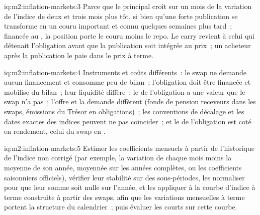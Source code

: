 \begin{solution}{iq:m2:inflation-markets:3}
Parce que le principal croît sur un mois de la variation de l'indice de deux et trois
mois plus tôt, si bien qu'une forte publication se transforme en un couru important et connu quelques
semaines plus tard~; financée au , la position porte le couru moins le
repo. Le carry revient à celui qui détenait l'obligation avant que la publication soit intégrée au prix~; un acheteur
après la publication le paie dans le prix à terme.
\end{solution}

\begin{solution}{iq:m2:inflation-markets:4}
Instruments et coûts différents~: le swap ne demande aucun financement et consomme peu de
bilan~; l'obligation doit être financée et mobilise du bilan~; leur liquidité
diffère~; le  de l'obligation a une valeur que le swap n'a pas~; l'offre et la demande
diffèrent (fonds de pension receveurs dans les swaps, émissions du Trésor en obligations)~; les
conventions de décalage et les dates exactes des indices peuvent ne pas coïncider~; et le
 de l'obligation est coté en rendement, celui du swap en .
\end{solution}

\begin{solution}{iq:m2:inflation-markets:5}
Estimer les coefficients mensuels à partir de l'historique de l'indice non corrigé (par exemple,
la variation de chaque mois moins la moyenne de son année, moyennée sur les années complètes, ou les
coefficients saisonniers officiels), vérifier leur stabilité sur des sous-périodes, les normaliser
pour que leur somme soit nulle sur l'année, et les appliquer à la courbe d'indice à terme
construite à partir des swaps, afin que les variations mensuelles à terme portent la structure du calendrier~;
puis évaluer les  courts sur cette courbe.
\end{solution}

